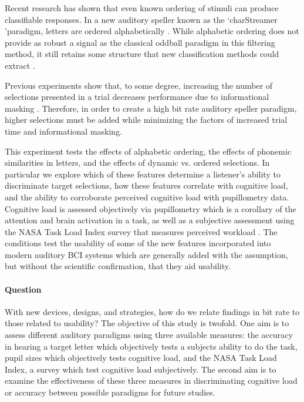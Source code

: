 \documentclass[10pt]{article}
\begin{document}
Recent research has shown that even known ordering of stimuli can
produce classifiable responses.  In a new auditory speller known
as the \lq charStreamer \rq paradigm, letters are ordered
alphabetically \cite{Hohne2014}.  While alphabetic ordering does not
provide as robust a signal as the classical oddball paradigm in this
filtering method, it still retains some structure that
new classification methods could extract \cite{Hohne2014}.  

Previous experiments show that, to some degree, increasing the number
of selections presented in a trial decreases performance due to
informational masking \cite{Maddox2012a}. Therefore, in order to
create a high bit rate auditory speller paradigm, higher selections
must be added while minimizing the factors of increased trial time
and informational masking.



This experiment tests the effects of alphabetic ordering, the
effects of phonemic similarities in letters, and the effects
of dynamic vs. ordered selections.  In particular we explore
which of these features determine a listener's ability to
discriminate target selections, how these features correlate
with cognitive load, and the ability to corroborate 
perceived cognitive load with pupillometry data.  Cognitive load is
assessed objectively via pupillometry which is a corollary of
the attention and brain activation in a
task\cite{Zekveld2014}, as well as a
subjective assessment using the NASA Task Load Index survey
that measures perceived workload \cite{Zickler2013a}.  The
conditions test the usability of some of the new features
incorporated into modern auditory BCI systems which are
generally added with the assumption, but without the scientific
confirmation, that they aid usability.    

\paragraph{Question}

With new devices, designs, and strategies, how do we relate
findings in bit rate to those related to usability?  The
objective of this study is twofold.  One aim is to assess
different auditory paradigms using three available measures:
the accuracy in hearing a target letter which objectively
tests a subjects ability to do the task,  pupil sizes which
objectively tests cognitive load, and the NASA Task Load
Index, a survey which test cognitive load subjectively.  The
second aim is to examine the effectiveness of these three
measures in discriminating cognitive load or accuracy between
possible paradigms for future studies.
\end{document}
